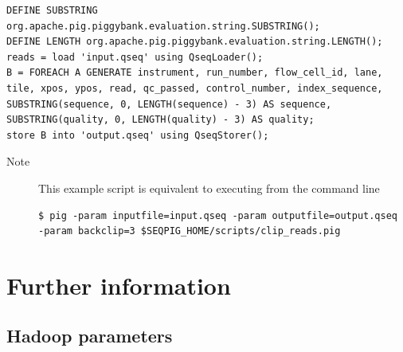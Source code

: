\begin{lstlisting}
DEFINE SUBSTRING org.apache.pig.piggybank.evaluation.string.SUBSTRING();
DEFINE LENGTH org.apache.pig.piggybank.evaluation.string.LENGTH();
reads = load 'input.qseq' using QseqLoader();
B = FOREACH A GENERATE instrument, run_number, flow_cell_id, lane, tile, xpos, ypos, read, qc_passed, control_number, index_sequence, SUBSTRING(sequence, 0, LENGTH(sequence) - 3) AS sequence, SUBSTRING(quality, 0, LENGTH(quality) - 3) AS quality;
store B into 'output.qseq' using QseqStorer();
\end{lstlisting}
\begin{description}
	\item[Note] This example script is equivalent to executing from the command line
\begin{lstlisting}
$ pig -param inputfile=input.qseq -param outputfile=output.qseq -param backclip=3 $SEQPIG_HOME/scripts/clip_reads.pig
\end{lstlisting}
\end{description}

\section{Further information}

\subsection{Hadoop parameters}


